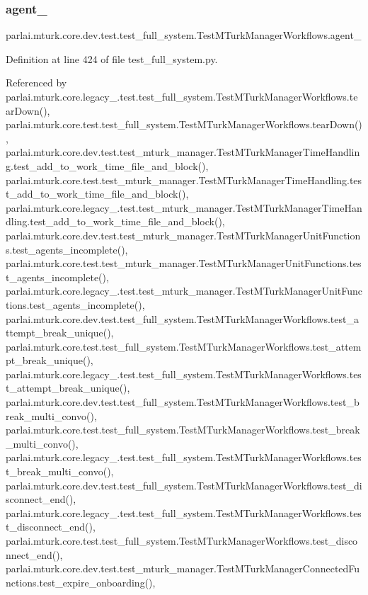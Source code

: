 \subsubsection{\texorpdfstring{agent\+\_}{agent\_2}}
{\footnotesize\ttfamily parlai.\+mturk.\+core.\+dev.\+test.\+test\+\_\+full\+\_\+system.\+Test\+M\+Turk\+Manager\+Workflows.\+agent\+\_}



Definition at line 424 of file test\+\_\+full\+\_\+system.\+py.



Referenced by parlai.\+mturk.\+core.\+legacy\+\_.\+test.\+test\+\_\+full\+\_\+system.\+Test\+M\+Turk\+Manager\+Workflows.\+tear\+Down(), parlai.\+mturk.\+core.\+test.\+test\+\_\+full\+\_\+system.\+Test\+M\+Turk\+Manager\+Workflows.\+tear\+Down(), parlai.\+mturk.\+core.\+dev.\+test.\+test\+\_\+mturk\+\_\+manager.\+Test\+M\+Turk\+Manager\+Time\+Handling.\+test\+\_\+add\+\_\+to\+\_\+work\+\_\+time\+\_\+file\+\_\+and\+\_\+block(), parlai.\+mturk.\+core.\+test.\+test\+\_\+mturk\+\_\+manager.\+Test\+M\+Turk\+Manager\+Time\+Handling.\+test\+\_\+add\+\_\+to\+\_\+work\+\_\+time\+\_\+file\+\_\+and\+\_\+block(), parlai.\+mturk.\+core.\+legacy\+\_.\+test.\+test\+\_\+mturk\+\_\+manager.\+Test\+M\+Turk\+Manager\+Time\+Handling.\+test\+\_\+add\+\_\+to\+\_\+work\+\_\+time\+\_\+file\+\_\+and\+\_\+block(), parlai.\+mturk.\+core.\+dev.\+test.\+test\+\_\+mturk\+\_\+manager.\+Test\+M\+Turk\+Manager\+Unit\+Functions.\+test\+\_\+agents\+\_\+incomplete(), parlai.\+mturk.\+core.\+test.\+test\+\_\+mturk\+\_\+manager.\+Test\+M\+Turk\+Manager\+Unit\+Functions.\+test\+\_\+agents\+\_\+incomplete(), parlai.\+mturk.\+core.\+legacy\+\_.\+test.\+test\+\_\+mturk\+\_\+manager.\+Test\+M\+Turk\+Manager\+Unit\+Functions.\+test\+\_\+agents\+\_\+incomplete(), parlai.\+mturk.\+core.\+dev.\+test.\+test\+\_\+full\+\_\+system.\+Test\+M\+Turk\+Manager\+Workflows.\+test\+\_\+attempt\+\_\+break\+\_\+unique(), parlai.\+mturk.\+core.\+test.\+test\+\_\+full\+\_\+system.\+Test\+M\+Turk\+Manager\+Workflows.\+test\+\_\+attempt\+\_\+break\+\_\+unique(), parlai.\+mturk.\+core.\+legacy\+\_.\+test.\+test\+\_\+full\+\_\+system.\+Test\+M\+Turk\+Manager\+Workflows.\+test\+\_\+attempt\+\_\+break\+\_\+unique(), parlai.\+mturk.\+core.\+dev.\+test.\+test\+\_\+full\+\_\+system.\+Test\+M\+Turk\+Manager\+Workflows.\+test\+\_\+break\+\_\+multi\+\_\+convo(), parlai.\+mturk.\+core.\+test.\+test\+\_\+full\+\_\+system.\+Test\+M\+Turk\+Manager\+Workflows.\+test\+\_\+break\+\_\+multi\+\_\+convo(), parlai.\+mturk.\+core.\+legacy\+\_.\+test.\+test\+\_\+full\+\_\+system.\+Test\+M\+Turk\+Manager\+Workflows.\+test\+\_\+break\+\_\+multi\+\_\+convo(), parlai.\+mturk.\+core.\+dev.\+test.\+test\+\_\+full\+\_\+system.\+Test\+M\+Turk\+Manager\+Workflows.\+test\+\_\+disconnect\+\_\+end(), parlai.\+mturk.\+core.\+legacy\+\_.\+test.\+test\+\_\+full\+\_\+system.\+Test\+M\+Turk\+Manager\+Workflows.\+test\+\_\+disconnect\+\_\+end(), parlai.\+mturk.\+core.\+test.\+test\+\_\+full\+\_\+system.\+Test\+M\+Turk\+Manager\+Workflows.\+test\+\_\+disconnect\+\_\+end(), parlai.\+mturk.\+core.\+dev.\+test.\+test\+\_\+mturk\+\_\+manager.\+Test\+M\+Turk\+Manager\+Connected\+Functions.\+test\+\_\+expire\+\_\+onboarding(), 
